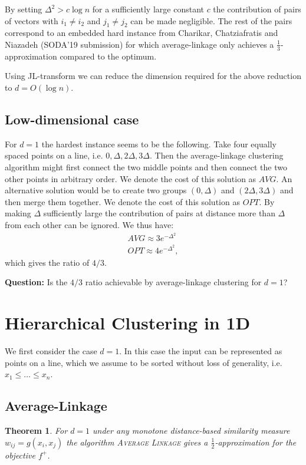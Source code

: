 \documentclass[twoside]{article}
\newtheorem{theorem}{Theorem}[section]
\begin{document}
By setting $\Delta^2 > c \log n$ for a sufficiently large constant $c$ the contribution of pairs of vectors with $i_1 \neq i_2$ and $j_1 \neq j_2$ can be made negligible. 
The rest of the pairs correspond to an embedded hard instance from Charikar, Chatziafratis and Niazadeh (SODA'19 submission) for which average-linkage only achieves a $\frac13$-approximation compared to the optimum.

Using JL-transform we can reduce the dimension required for the above reduction to $d = O(\log n)$.

\subsection{Low-dimensional case}

For $d = 1$ the hardest instance seems to be the following.
Take four equally spaced points on a line, i.e. $0, \Delta, 2\Delta, 3 \Delta$.
Then the average-linkage clustering algorithm might first connect the two middle points and then connect the two other points in arbitrary order.
We denote the cost of this solution as $AVG$.
An alternative solution would be to create two groups $(0, \Delta)$ and $(2\Delta, 3\Delta)$ and then merge them together.
We denote the cost of this solution as $OPT$.
By making $\Delta$ sufficiently large the contribution of pairs at distance more than $\Delta$ from each other can be ignored. We thus have:
\begin{align*}
AVG \approx 3 e^{-\Delta^2} \\
OPT \approx 4 e^{- \Delta^2},
\end{align*}
which gives the ratio of $4/3$.

\textbf{Question:} Is the $4/3$ ratio achievable by average-linkage clustering for $d = 1$?


\section{Hierarchical Clustering in 1D}
We first consider the case $d = 1$.
In this case the input can be represented as points on a line, which we assume to be sorted without loss of generality, i.e. $x_1 \le \dots  \le x_n$.

\subsection{Average-Linkage}
\begin{theorem}\label{thm:average-linkage}
	For $d = 1$ under any monotone distance-based similarity measure $w_{ij} = g(x_i, x_j)$ the algorithm \textsc{Average Linkage} gives a $\frac12$-approximation for the objective $f^+$.
\end{theorem}
\end{document}
